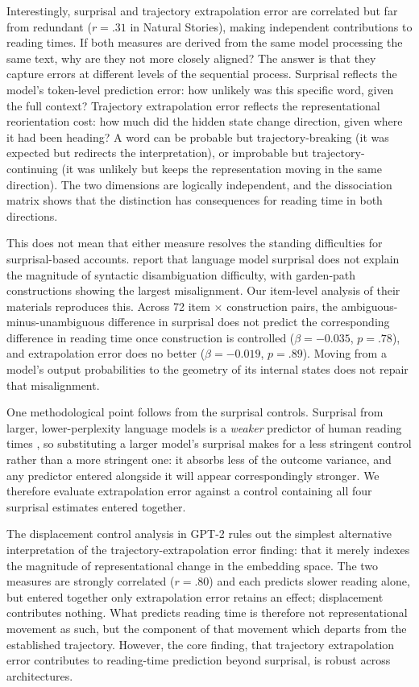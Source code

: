 \documentclass[12pt]{article}
\newcommand{\new}[1]{#1}   %
\begin{document}
Interestingly, surprisal and trajectory extrapolation error are \new{correlated but far from redundant ($r = .31$ in Natural Stories)}, making independent contributions to reading times. If both measures are derived from the same model processing the same text, why are they \new{not more closely aligned}? The answer is that they capture errors at different levels of the sequential process. Surprisal reflects the model's token-level prediction error: how unlikely was this specific word, given the full context? Trajectory extrapolation error reflects the representational reorientation cost: how much did the hidden state change direction, given where it had been heading? A word can be probable but trajectory-breaking (it was expected but redirects the interpretation), or improbable but trajectory-continuing (it was unlikely but keeps the representation moving in the same direction). The two dimensions are logically independent, and the \new{dissociation matrix shows that the distinction has consequences for reading time in both directions}.

\new{This does not mean that either measure resolves the standing difficulties for surprisal-based accounts. \citet{huang2024} report that language model surprisal does not explain the magnitude of syntactic disambiguation difficulty, with garden-path constructions showing the largest misalignment. Our item-level analysis of their materials reproduces this. Across 72 item $\times$ construction pairs, the ambiguous-minus-unambiguous difference in surprisal does not predict the corresponding difference in reading time once construction is controlled ($\beta = -0.035$, $p = .78$), and extrapolation error does no better ($\beta = -0.019$, $p = .89$). Moving from a model's output probabilities to the geometry of its internal states does not repair that misalignment.}

\new{One methodological point follows from the surprisal controls. Surprisal from larger, lower-perplexity language models is a \textit{weaker} predictor of human reading times \citep{oh2023b}, so substituting a larger model's surprisal makes for a less stringent control rather than a more stringent one: it absorbs less of the outcome variance, and any predictor entered alongside it will appear correspondingly stronger. We therefore evaluate extrapolation error against a control containing all four surprisal estimates entered together.}

The displacement control analysis in GPT-2 rules out the simplest alternative interpretation of the trajectory-extrapolation error finding: that it merely indexes the magnitude of representational change in the embedding space. \new{The two measures are strongly correlated ($r = .80$) and each predicts slower reading alone, but entered together only extrapolation error retains an effect; displacement contributes nothing. What predicts reading time is therefore not representational movement as such, but the component of that movement which departs from the established trajectory.} However, the core finding, that trajectory extrapolation error contributes to reading-time prediction beyond surprisal, is robust across architectures.
\end{document}
